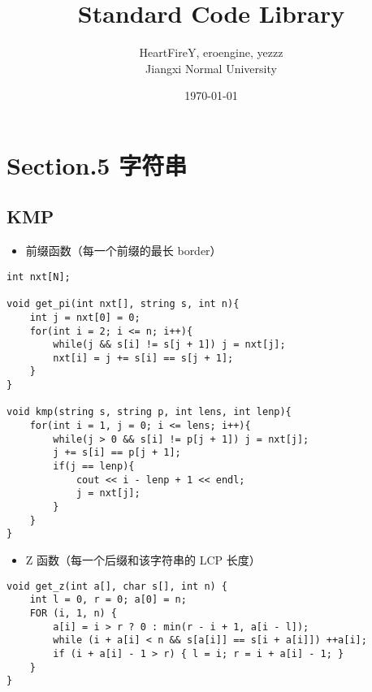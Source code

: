 \documentclass[]{article}
\date{}
\title{\vspace{50mm} \huge Standard Code Library \\[20pt]}
\author{HeartFireY, eroengine, yezzz \\[10pt] Jiangxi Normal University}
\date{\today}
\providecommand{\tightlist}{%
  \setlength{\itemsep}{0pt}\setlength{\parskip}{0pt}}
\begin{document}
\begin{titlepage}

\maketitle

\end{titlepage}

\newpage

\renewcommand\labelitemi{$\bullet$}

{
\setcounter{tocdepth}{3}
\tableofcontents
\newpage
}








\hypertarget{section.5-ux5b57ux7b26ux4e32}{%
\section{Section.5 字符串}\label{section.5-ux5b57ux7b26ux4e32}}

\hypertarget{kmp}{%
\subsection{KMP}\label{kmp}}

\begin{itemize}
\tightlist
\item
  前缀函数（每一个前缀的最长 border）
\end{itemize}

\begin{verbatim}
int nxt[N];

void get_pi(int nxt[], string s, int n){
    int j = nxt[0] = 0;
    for(int i = 2; i <= n; i++){
        while(j && s[i] != s[j + 1]) j = nxt[j];
        nxt[i] = j += s[i] == s[j + 1];
    }
}

void kmp(string s, string p, int lens, int lenp){
    for(int i = 1, j = 0; i <= lens; i++){
        while(j > 0 && s[i] != p[j + 1]) j = nxt[j];
        j += s[i] == p[j + 1];
        if(j == lenp){
            cout << i - lenp + 1 << endl;
            j = nxt[j];
        }
    }
}
\end{verbatim}

\begin{itemize}
\tightlist
\item
  Z 函数（每一个后缀和该字符串的 LCP 长度）
\end{itemize}

\begin{verbatim}
void get_z(int a[], char s[], int n) {
    int l = 0, r = 0; a[0] = n;
    FOR (i, 1, n) {
        a[i] = i > r ? 0 : min(r - i + 1, a[i - l]);
        while (i + a[i] < n && s[a[i]] == s[i + a[i]]) ++a[i];
        if (i + a[i] - 1 > r) { l = i; r = i + a[i] - 1; }
    }
}
\end{verbatim}
\end{document}
